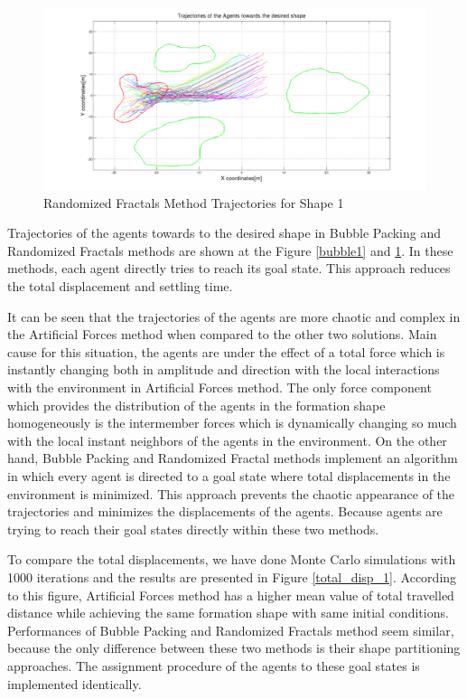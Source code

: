 \begin{figure}[H]
\caption{Randomized Fractals Method Trajectories for Shape 1} \label{randomiz1}
\centerline{\includegraphics[scale = 0.32]{Randomized_Trajectories_1}}
\end{figure} 	

Trajectories of the agents towards to the desired shape in Bubble Packing and Randomized Fractals methods are shown at the Figure \ref{bubble1} and \ref{randomiz1}. In these methods, each agent directly tries to reach its goal state. This approach reduces the total displacement and settling time.
			
It can be seen that the trajectories of the agents are more chaotic and complex in the Artificial Forces method when compared to the other two solutions. Main cause for this situation, the agents are under the effect of a total force which is instantly changing both in amplitude and direction with the local interactions with the environment in Artificial Forces method. The only force component which provides the distribution of the agents in the formation shape homogeneously is the intermember forces which is dynamically changing so much with the local instant neighbors of the agents in the environment. On the other hand, Bubble Packing and Randomized Fractal methods implement an algorithm in which every agent is directed to a goal state where total displacements in the environment is minimized. This approach prevents the chaotic appearance of the trajectories and minimizes the displacements of the agents. Because agents are trying to reach their goal states directly within these two methods. 

To compare the total displacements, we have done Monte Carlo simulations with 1000 iterations and the results are presented in Figure \ref{total_disp_1}. According to this figure, Artificial Forces method has a higher mean value of total travelled distance while achieving the same formation shape with same initial conditions. Performances of Bubble Packing and Randomized Fractals method seem similar, because the only difference between these two methods is their shape partitioning approaches. The assignment procedure of the agents to these goal states is implemented identically. 
		
